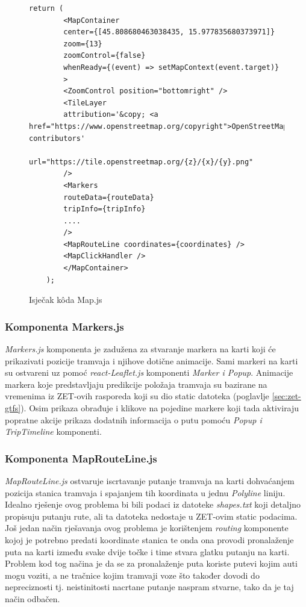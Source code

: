 \documentclass[zavrsnirad]{fer}
\begin{document}
\begin{figure}[H]
	\centering
	\begin{minipage}{0.9\linewidth}
		\begin{lstlisting}[language=JSX]
	return (
		<MapContainer
		center={[45.808680463038435, 15.977835680373971]}
		zoom={13}
		zoomControl={false}
		whenReady={(event) => setMapContext(event.target)}
		>
		<ZoomControl position="bottomright" />
		<TileLayer
		attribution='&copy; <a href="https://www.openstreetmap.org/copyright">OpenStreetMap</a> contributors'
		url="https://tile.openstreetmap.org/{z}/{x}/{y}.png"
		/>
		<Markers
		routeData={routeData}
		tripInfo={tripInfo}
		....
		/>
		<MapRouteLine coordinates={coordinates} />
		<MapClickHandler />
		</MapContainer>
	);
		\end{lstlisting}
	\end{minipage}
	\caption{Isječak k\^oda Map.js}
	\label{slk:mapjs}
\end{figure}

\subsubsection{Komponenta Markers.js}
\textit{Markers.js} komponenta je zadužena za stvaranje markera na karti koji će prikazivati pozicije tramvaja i njihove dotične animacije. Sami markeri na karti su ostvareni uz pomoć \textit{react-\textit{Leaflet.js}} komponenti \textit{Marker i Popup}. Animacije markera koje predstavljaju predikcije položaja tramvaja su bazirane na vremenima iz ZET-ovih rasporeda koji su dio static datoteka (poglavlje \ref{sec:zet-gtfs}). Osim prikaza obrađuje i klikove na pojedine markere koji tada aktiviraju popratne akcije prikaza dodatnih informacija o putu pomoću \textit{Popup i TripTimeline} komponenti.

\subsubsection{Komponenta MapRouteLine.js}
\textit{MapRouteLine.js} ostvaruje iscrtavanje putanje tramvaja na karti dohvaćanjem pozicija stanica tramvaja i spajanjem tih koordinata u jednu \textit{Polyline} liniju. Idealno rješenje ovog problema bi bili podaci iz datoteke \textit{shapes.txt} koji detaljno propisuju putanju rute, ali ta datoteka nedostaje u ZET-ovim static podacima.
Još jedan način rješavanja ovog problema je korištenjem \textit{routing} komponente kojoj je potrebno predati koordinate stanica te onda ona provodi pronalaženje puta na karti između svake dvije točke i time stvara glatku putanju na karti. Problem kod tog načina je da se za pronalaženje puta koriste putevi kojim auti mogu voziti, a ne tračnice kojim tramvaji voze što također dovodi do nepreciznosti tj. neistinitosti nacrtane putanje naspram stvarne, tako da je taj način odbačen.
\end{document}
